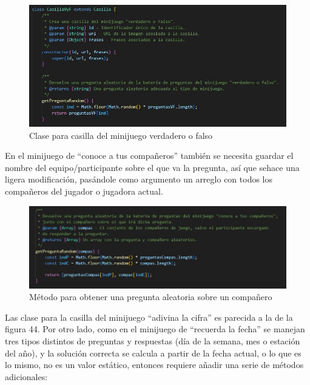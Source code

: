 \begin{figure}[H]
	\centering
	\includegraphics{imgs/codigo-casillas-4.jpg}
	\caption{Clase para casilla del minijuego verdadero o falso}
	\label{fig:codigo-casillas-4}
\end{figure}

En el minijuego de \enquote{conoce a tus compañeros} también se necesita guardar el nombre del equipo/participante sobre el que va la pregunta, así que sehace una ligera modificación, pasándole como argumento un arreglo con todos los compañeros del jugador o jugadora actual.

\begin{figure}[H]
	\centering
	\includegraphics{imgs/codigo-casillas-5.jpg}
	\caption{Método para obtener una pregunta aleatoria sobre un compañero}
	\label{fig:codigo-casillas-5}
\end{figure}

Las clase para la casilla del minijuego \enquote{adivina la cifra} es parecida a la de la figura 44. Por otro lado, como en el minijuego de \enquote{recuerda la fecha} se manejan tres tipos distintos de preguntas y respuestas (día de la semana, mes o estación del año), y la solución correcta se calcula a partir de la fecha actual, o lo que es lo mismo, no es un valor estático, entonces requiere añadir una serie de métodos adicionales:


